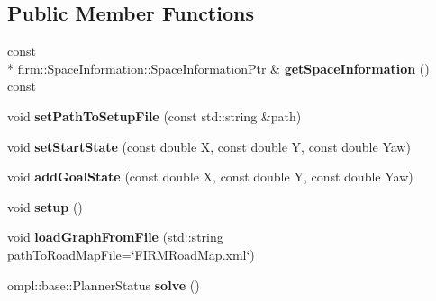 \subsection*{Public Member Functions}
\begin{DoxyCompactItemize}
\item 
\hypertarget{class_f_i_r_m_aruco2_d_r_o_s_setup_a6683597a5e6d8e5ee1b42539df759e36}{const \\*
firm\-::\-Space\-Information\-::\-Space\-Information\-Ptr \& {\bfseries get\-Space\-Information} () const }\label{class_f_i_r_m_aruco2_d_r_o_s_setup_a6683597a5e6d8e5ee1b42539df759e36}

\item 
\hypertarget{class_f_i_r_m_aruco2_d_r_o_s_setup_a48c07d79b998d021486374c3ba2254d9}{void {\bfseries set\-Path\-To\-Setup\-File} (const std\-::string \&path)}\label{class_f_i_r_m_aruco2_d_r_o_s_setup_a48c07d79b998d021486374c3ba2254d9}

\item 
\hypertarget{class_f_i_r_m_aruco2_d_r_o_s_setup_af8969d0882171ee7ca972bc6deff50f3}{void {\bfseries set\-Start\-State} (const double X, const double Y, const double Yaw)}\label{class_f_i_r_m_aruco2_d_r_o_s_setup_af8969d0882171ee7ca972bc6deff50f3}

\item 
\hypertarget{class_f_i_r_m_aruco2_d_r_o_s_setup_a58dc6966344b3b37d6745dc18a668177}{void {\bfseries add\-Goal\-State} (const double X, const double Y, const double Yaw)}\label{class_f_i_r_m_aruco2_d_r_o_s_setup_a58dc6966344b3b37d6745dc18a668177}

\item 
\hypertarget{class_f_i_r_m_aruco2_d_r_o_s_setup_a2dd131df0092a0941379337ce6d4cd57}{void {\bfseries setup} ()}\label{class_f_i_r_m_aruco2_d_r_o_s_setup_a2dd131df0092a0941379337ce6d4cd57}

\item 
\hypertarget{class_f_i_r_m_aruco2_d_r_o_s_setup_af12f82ff7b16da7b72ae323c5ace24d4}{void {\bfseries load\-Graph\-From\-File} (std\-::string path\-To\-Road\-Map\-File=\char`\"{}F\-I\-R\-M\-Road\-Map.\-xml\char`\"{})}\label{class_f_i_r_m_aruco2_d_r_o_s_setup_af12f82ff7b16da7b72ae323c5ace24d4}

\item 
\hypertarget{class_f_i_r_m_aruco2_d_r_o_s_setup_af520bb8169510ae1cecde71440cd3384}{ompl\-::base\-::\-Planner\-Status {\bfseries solve} ()}\label{class_f_i_r_m_aruco2_d_r_o_s_setup_af520bb8169510ae1cecde71440cd3384}


\end{DoxyCompactItemize}
